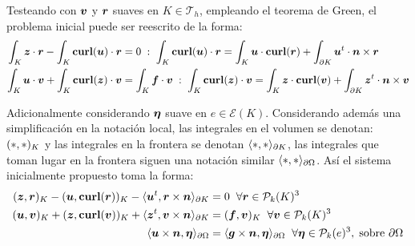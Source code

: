 \documentclass{article}
\begin{document}
\noindent Testeando con $\boldsymbol{v}$ y $\boldsymbol{r}$ suaves en $K \in \mathcal{T}_h$, empleando el teorema de Green, el problema inicial puede ser reescrito de la forma:
\begin{align*}
    \int_K \boldsymbol{z} \cdot \boldsymbol{r} - \int_K \textbf{\textup{curl}}(\boldsymbol{u}) \cdot \boldsymbol{r} &= 0 
    \hspace{1mm} : \hspace{1mm} 
    \int_K \textbf{\textup{curl}}(\boldsymbol{u}) \cdot \boldsymbol{r} = \int_K \boldsymbol{u} \cdot \textbf{\textup{curl}}(\boldsymbol{r}) + \int_{\partial K} \boldsymbol{u}^t \cdot \boldsymbol{n} \times \boldsymbol{r} \\
    \int_K \boldsymbol{u} \cdot \boldsymbol{v} + \int_K \textbf{\textup{curl}}(\boldsymbol{z}) \cdot \boldsymbol{v} &= \int_K \boldsymbol{f} \cdot \boldsymbol{v}
    \hspace{1mm} : \hspace{1mm} 
    \int_K \textbf{\textup{curl}}(\boldsymbol{z}) \cdot \boldsymbol{v} = \int_K \boldsymbol{z} \cdot \textbf{\textup{curl}}(\boldsymbol{v}) + \int_{\partial K} \boldsymbol{z}^t \cdot \boldsymbol{n} \times \boldsymbol{v}
\end{align*}

\noindent Adicionalmente considerando $\boldsymbol{\eta}$ suave en $e \in \mathcal{E}(K)$. Considerando además una simplificación en la notación local, las integrales en el volumen se denotan: $(*, *)_K$ y las integrales en la frontera se denotan $\langle *, * \rangle_{\partial K}$, las integrales que toman lugar en la frontera siguen una notación similar $\langle *, * \rangle_{\partial \Omega}$. Así el sistema inicialmente propuesto toma la forma:
\begin{align*}
    (\boldsymbol{z}, \boldsymbol{r})_K - (\boldsymbol{u}, \textbf{\textup{curl}}(\boldsymbol{r}))_K - \langle \boldsymbol{u}^t, \boldsymbol{r} \times \boldsymbol{n} \rangle_{\partial K} &= 0
    	\hspace{2 mm}\forall \boldsymbol{r} \in \mathcal{P}_k(K)^3  \\
    (\boldsymbol{u}, \boldsymbol{v})_K + (\boldsymbol{z}, \textbf{\textup{curl}}(\boldsymbol{v}))_K + \langle \boldsymbol{z}^t, \boldsymbol{v} \times \boldsymbol{n} \rangle_{\partial K} &= (\boldsymbol{f}, \boldsymbol{v})_K
    	\hspace{2 mm}\forall \boldsymbol{v} \in \mathcal{P}_k(K)^3 \\
    \langle \boldsymbol{u} \times \boldsymbol{n}, \boldsymbol{\eta} \rangle_{\partial \Omega} &= \langle \boldsymbol{g} \times \boldsymbol{n}, \boldsymbol{\eta} \rangle_{\partial \Omega}
    \hspace{2 mm} \forall \boldsymbol{\eta} \in \mathcal{P}_k(e)^3, \hspace{1mm} \textup{sobre}~\partial \Omega
\end{align*}
\end{document}
